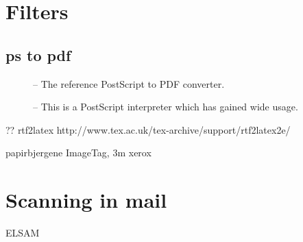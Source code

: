 \section{Filters}
\label{sec:cactus-filters}


\subsection{ps to pdf}
\label{sec:filter-ps-to-pdf}

\begin{description}
\item[] -- The reference PostScript to PDF converter.
  
\item[] -- This is a
  PostScript interpreter which has gained wide usage.
\end{description}

\textsf{??} rtf2latex http://www.tex.ac.uk/tex-archive/support/rtf2latex2e/


papirbjergene ImageTag, 3m xerox

\section{Scanning in mail}

\textsf{ELSAM}




